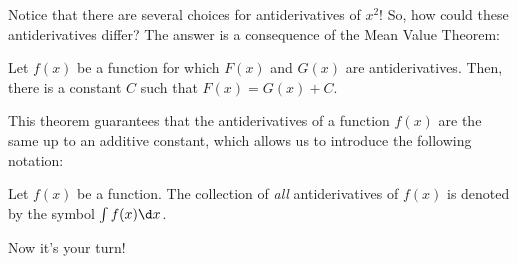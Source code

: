 \documentclass[nooutcomes]{ximera}
\begin{document}
Notice that there are several choices for antiderivatives of $x^2$!  So, how could these antiderivatives differ?  The answer is a consequence of the Mean Value Theorem:

\begin{theorem}
Let $f(x)$ be a function for which $F(x)$ and $G(x)$ are antiderivatives.  Then, there is a constant $C$ such that $F(x) = G(x) +C$. 
\end{theorem}

This theorem guarantees that the antiderivatives of a function $f(x)$ are the same up to an additive constant, which allows us to introduce the following notation:


\begin{definition}
Let $f(x)$ be a function.  The collection of \emph{all} antiderivatives of $f(x)$ is denoted by the symbol $\int f(x) \d x$. 
\end{definition}

Now it's your turn!

\end{document}
